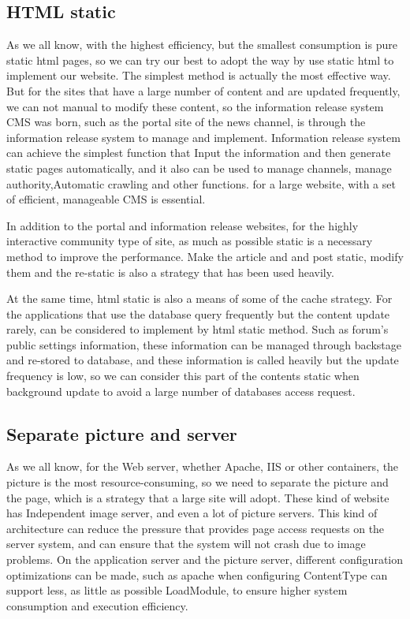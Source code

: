 \documentclass[a4paper]{article}
\begin{document}
\subsection{HTML static}
    As we all know, with the highest efficiency, but the smallest consumption is pure static html pages, so we can try our best to adopt the way by use static html to implement our website. The simplest method is actually the most effective way. But for the sites that have a large number of content and are updated frequently, we can not manual to modify these content,  so the information       release system CMS was born, such as the portal site of the news channel, is through the information release system to manage and implement. Information release system can achieve the simplest function that Input the information and then generate static pages automatically, and it also can be used to manage channels, manage authority,Automatic crawling and other functions. for a large website, with a set of efficient, manageable CMS is essential.
    
In addition to the portal and information release websites, for the highly interactive community type of site, as much as possible static is a necessary  method to improve the performance. Make the article and and post static, modify them and the re-static is also a strategy that has been used heavily. 
    
At the same time, html static is also a means of some of the cache strategy. For the applications that use the database query frequently but the content update rarely, can be considered to implement by html static method. Such as forum’s public settings information, these information can be managed through backstage and re-stored to database, and these information  is called heavily but the update frequency is low, so we can consider this part of the contents static when background update to avoid a large number of databases access request.
\subsection{Separate picture and server}
As we all know, for the Web server, whether Apache, IIS or other containers, the picture is the most resource-consuming, so we need to separate the picture and the page, which is a strategy that a large site will adopt. These kind of website has Independent image server, and even a lot of picture servers. This kind of architecture can reduce the pressure that provides page access requests on the server system, and can ensure that the system will not crash due to image problems. On the application server and the picture server, different configuration optimizations can be made, such as apache when configuring ContentType can support less, as little as possible LoadModule, to ensure higher system consumption and execution efficiency.
\end{document}
